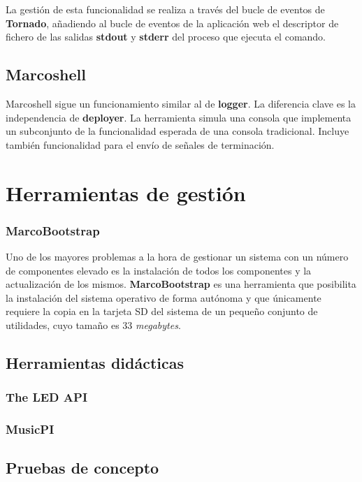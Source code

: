 La gestión de esta funcionalidad se realiza a través del bucle de eventos de \textbf{Tornado}, añadiendo al bucle de eventos de la aplicación web el descriptor de fichero de las salidas \textbf{stdout} y \textbf{stderr} del proceso que ejecuta el comando.

\subsection{Marcoshell}

Marcoshell sigue un funcionamiento similar al de \textbf{logger}. La diferencia clave es la independencia de \textbf{deployer}. La herramienta simula una consola que implementa un subconjunto de la funcionalidad esperada de una consola tradicional. Incluye también funcionalidad para el envío de señales de terminación.

\section{Herramientas de gestión}

\subsubsection{MarcoBootstrap}

Uno de los mayores problemas a la hora de gestionar un sistema con un número de componentes elevado es la instalación de todos los componentes y la actualización de los mismos. \textbf{MarcoBootstrap} es una herramienta que posibilita la instalación del sistema operativo de forma autónoma y que únicamente requiere la copia en la tarjeta SD del sistema de un pequeño conjunto de utilidades, cuyo tamaño es 33 \textit{megabytes}.





\subsection{Herramientas didácticas}

\subsubsection{The LED API}

\subsubsection{MusicPI}


\subsection{Pruebas de concepto}

